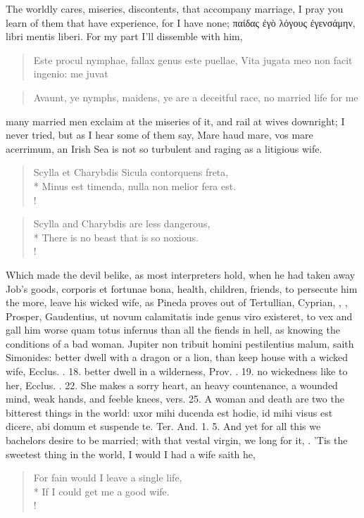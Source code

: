 The worldly cares, miseries, discontents, that accompany marriage, I
pray you learn of them that have experience, for I have none; 
\textgreek{παίδας ἐγὸ λόγους ἐγενσάμην}, libri mentis liberi. For my part I'll
dissemble with him,
%
\begin{latin}
\begin{verse}
Este procul nymphae, fallax genus este puellae,
Vita jugata meo non facit ingenio: me juvat
\end{verse}
\end{latin}
\translationrule%
\begin{verse}%
Avaunt, ye nymphs, maidens, ye are a deceitful race,
no married life for me
\end{verse}%
%
many married men exclaim at the miseries of it, and rail at wives
downright; I never tried, but as I hear some of them say, Mare
haud mare, vos mare acerrimum, an Irish Sea is not so turbulent and
raging as a litigious wife.
%
\begin{latin}
\begin{verse}%
Scylla et Charybdis Sicula contorquens freta,\\*
Minus est timenda, nulla non melior fera est.\\!
\end{verse}%
\end{latin}
\translationrule%
\begin{verse}%
Scylla and Charybdis are less dangerous,\\*
There is no beast that is so noxious.\\!
\end{verse}%
%

Which made the devil belike, as most interpreters hold, when he had
taken away Job's goods, corporis et fortunae bona, health, children,
friends, to persecute him the more, leave his wicked wife, as Pineda
proves out of Tertullian, Cyprian, \Austin{}, \Chrysostom{}, Prosper,
Gaudentius, \etc{} ut novum calamitatis inde genus viro existeret, to vex
and gall him worse quam totus infernus than all the fiends in hell, as
knowing the conditions of a bad woman. Jupiter non tribuit homini
pestilentius malum, saith Simonides: better dwell with a dragon or a
lion, than keep house with a wicked wife, Ecclus. . 18. better dwell
in a wilderness, Prov. . 19. no wickedness like to her, Ecclus. .
22. She makes a sorry heart, an heavy countenance, a wounded mind, weak
hands, and feeble knees, vers. 25. A woman and death are two the
bitterest things in the world: uxor mihi ducenda est hodie, id mihi
visus est dicere, abi domum et suspende te. Ter. And. 1. 5. And yet for
all this we bachelors desire to be married; with that vestal virgin, we
long for it, . 'Tis
the sweetest thing in the world, I would I had a wife saith he,
%
\begin{verse}%
For fain would I leave a single life,\\*
If I could get me a good wife.\\!
\end{verse}%

